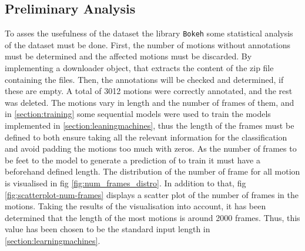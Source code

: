 \subsection{Preliminary Analysis}
To asses the usefulness of the dataset the library \texttt{Bokeh} some statistical analysis of the dataset must be done. First, the number of motions without annotations must be determined and the affected motions must be discarded. By implementing a downloader object, that extracts the content of the zip file containing the files. Then, the annotations will be checked and determined, if these are empty. A total of 3012 motions were correctly annotated, and the rest was deleted.\newline
The motions vary in length and the number of frames of them, and in \ref{section:training} some sequential models were used to train the models implemented in \ref{section:leaningmachines}, thus the length of the frames must be defined to both ensure taking all the relevant information for the classification and avoid padding the motions too much with zeros. As the number of frames to be feet to the model to generate a prediction of to train it must have a beforehand defined length. The distribution of the number of frame for all motion is visualised in fig \ref{fig:num_frames_distro}. In addition to that, fig \ref{fig:scatterplot-num-frames} displays a scatter plot of the number of frames in the motions. Taking the results of the visualisation into account, it has been determined that the length of the most motions is around 2000 frames. Thus, this value has been chosen to be the standard input length in \ref{section:learningmachines}.
